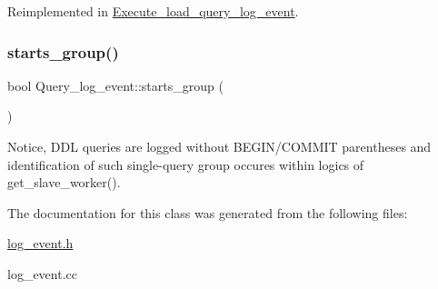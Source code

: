Reimplemented in \mbox{\hyperlink{classExecute__load__query__log__event_a8980ecbe8b7f0431a201498aa245c88d}{Execute\+\_\+load\+\_\+query\+\_\+log\+\_\+event}}.

\mbox{\label{classQuery__log__event_a694cad8964206f7838bae799319fc707}} 
\subsubsection{\texorpdfstring{starts\+\_\+group()}{starts\_group()}}
{\footnotesize\ttfamily bool Query\+\_\+log\+\_\+event\+::starts\+\_\+group (\begin{DoxyParamCaption}{ }\end{DoxyParamCaption})\hspace{0.3cm}{\ttfamily [inline]}}

Notice, D\+DL queries are logged without B\+E\+G\+I\+N/\+C\+O\+M\+M\+IT parentheses and identification of such single-\/query group occures within logics of {\ttfamily get\+\_\+slave\+\_\+worker()}. 

The documentation for this class was generated from the following files\+:\begin{DoxyCompactItemize}
\item 
\mbox{\hyperlink{log__event_8h}{log\+\_\+event.\+h}}\item 
log\+\_\+event.\+cc\end{DoxyCompactItemize}
